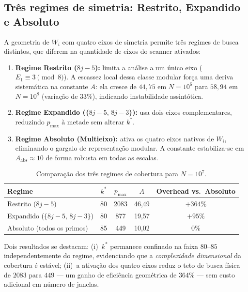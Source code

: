 \documentclass[11pt]{article}
\begin{document}
	\subsection{Três regimes de simetria: Restrito, Expandido e Absoluto}
	
	A geometria de $W_i$ com quatro eixos de simetria \cite{art7} permite três regimes de busca distintos, que diferem na quantidade de eixos do scanner ativados:
	
	\begin{enumerate}
		\item \textbf{Regime Restrito ($8j-5$):} limita a análise a um único eixo ($E_1\equiv 3\pmod 8$). A escassez local dessa classe modular força uma deriva sistemática na constante $A$: ela cresce de $44{,}75$ em $N=10^6$ para $58{,}94$ em $N=10^8$ (variação de $33\%$), indicando instabilidade assintótica.
		\item \textbf{Regime Expandido ($\{8j-5,\,8j-3\}$):} usa dois eixos complementares, reduzindo $p_{\max}$ à metade sem alterar $k^*$.
		\item \textbf{Regime Absoluto (Multieixo):} ativa os quatro eixos nativos de $W_i$, eliminando o gargalo de representação modular. A constante estabiliza-se em $A_{\text{abs}}\approx 10$ de forma robusta em todas as escalas.
	\end{enumerate}
	
	\begin{table}[h]
		\centering
		\caption{Comparação dos três regimes de cobertura para $N=10^7$.}
		\label{tab:tres_regimes}
		\begin{tabular}{lcccc}
			\toprule
			Regime & $k^*$ & $p_{\max}$ & $A$ & Overhead vs.\ Absoluto \\
			\midrule
			Restrito ($8j-5$)              & 80 & 2083 & 46,49 & $+364\%$ \\
			Expandido ($\{8j-5,\,8j-3\}$) & 80 &  877 & 19,57 & $+95\%$  \\
			Absoluto (todos os primos)     & 85 &  449 & 10,02 & $0\%$    \\
			\bottomrule
		\end{tabular}
	\end{table}
	
	Dois resultados se destacam: (i)~$k^*$ permanece confinado na faixa $80$–$85$ independentemente do regime, evidenciando que a \emph{complexidade dimensional} da cobertura é estável; (ii)~a ativação dos quatro eixos reduz o teto de busca física de $2083$ para $449$ — um ganho de eficiência geométrica de $364\%$ — sem custo adicional em número de janelas.
	
\end{document}
